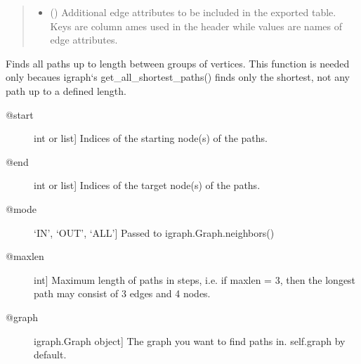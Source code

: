 \documentclass[letterpaper,10pt,english]{sphinxmanual}
\begin{document}
\begin{fulllineitems}
\begin{fulllineitems}
\begin{quote}
\begin{description}
\begin{itemize}
\item {} 
 () \textendash{} Additional edge attributes to be included in the exported table.
Keys are column ames used in the header while values are names
of edge attributes.

\end{itemize}

\end{description}\end{quote}

\end{fulllineitems}


\begin{fulllineitems}
\label{\detokenize{main:pypath.main.PyPath.filters}}
\end{fulllineitems}


\begin{fulllineitems}
\label{\detokenize{main:pypath.main.PyPath.find_all_paths}}
Finds all paths up to length  between groups of
vertices. This function is needed only becaues igraph{}`s
get\_all\_shortest\_paths() finds only the shortest, not any
path up to a defined length.
\begin{description}
\item[{@start}] \leavevmode{[}int or list{]}
Indices of the starting node(s) of the paths.

\item[{@end}] \leavevmode{[}int or list{]}
Indices of the target node(s) of the paths.

\item[{@mode}] \leavevmode{[}‘IN’, ‘OUT’, ‘ALL’{]}
Passed to igraph.Graph.neighbors()

\item[{@maxlen}] \leavevmode{[}int{]}
Maximum length of paths in steps, i.e. if maxlen = 3, then
the longest path may consist of 3 edges and 4 nodes.

\item[{@graph}] \leavevmode{[}igraph.Graph object{]}
The graph you want to find paths in. self.graph by default.


\end{description}
\end{fulllineitems}
\end{fulllineitems}
\end{document}
